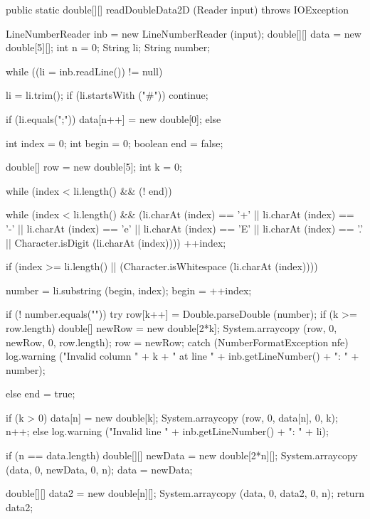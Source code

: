\begin{code}

   public static double[][] readDoubleData2D (Reader input)
                                              throws IOException\begin{hide} {
      LineNumberReader inb = new LineNumberReader (input);
      double[][] data = new double[5][];
      int n = 0;
      String li;
      String number;

      while ((li = inb.readLine()) != null) {
         li = li.trim();
         if (li.startsWith ("#"))
            continue;

         if (li.equals(";")) {
            data[n++] = new double[0];
         }
         else {

            int index = 0;
            int begin = 0;
            boolean end = false;

            double[] row = new double[5];
            int k = 0;

            while (index < li.length() && (! end))
            {
               while (index < li.length() &&
                  (li.charAt (index) == '+' || li.charAt (index) == '-' ||
                   li.charAt (index) == 'e' || li.charAt (index) == 'E' ||
                   li.charAt (index) == '.' || Character.isDigit (li.charAt (index))))
                  ++index;

               if (index >= li.length() || (Character.isWhitespace (li.charAt (index))))
               {
                  number = li.substring (begin, index);
                  begin = ++index;

                  if (! number.equals("")) {
                     try {
                        row[k++] = Double.parseDouble (number);
                        if (k >= row.length) {
                           double[] newRow = new double[2*k];
                           System.arraycopy (row, 0, newRow, 0, row.length);
                           row = newRow;
                        }
                     }
                     catch (NumberFormatException nfe) {
                        log.warning ("Invalid column " + k + " at line " + inb.getLineNumber() + ": " + number);
                     }
                  }
               }
               else {
                  end = true;
               }
            }

            if (k > 0) {
               data[n] = new double[k];
               System.arraycopy (row, 0, data[n], 0, k);
               n++;
            }
            else {
               log.warning ("Invalid line " + inb.getLineNumber() + ": " + li);
            }
         }

         if (n == data.length) {
            double[][] newData = new double[2*n][];
            System.arraycopy (data, 0, newData, 0, n);
            data = newData;
         }
      }

      double[][] data2 = new double[n][];
      System.arraycopy (data, 0, data2, 0, n);
      return data2;
   }\end{hide}
\end{code}
